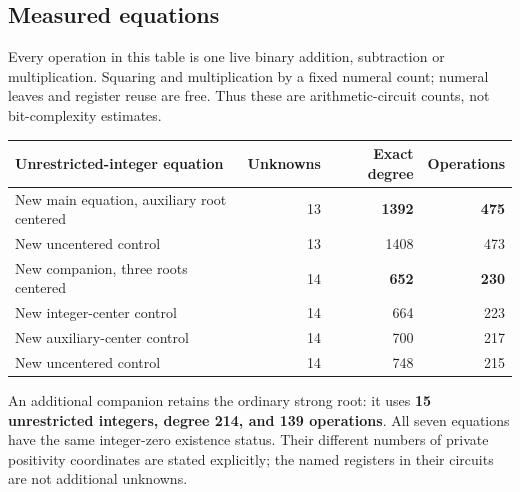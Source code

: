 \documentclass[11pt]{article}
\theoremstyle{remark}\newtheorem{remark}[theorem]{Remark}
\begin{document}
\subsection{Measured equations}
Every operation in this table is one live binary addition, subtraction or
multiplication. Squaring and multiplication by a fixed numeral count;
numeral leaves and register reuse are free. Thus these are arithmetic-circuit
counts, not bit-complexity estimates.
\begin{center}\small
\begin{tabular}{@{}lrrr@{}}\toprule
Unrestricted-integer equation & Unknowns & Exact degree & Operations\\\midrule
New main equation, auxiliary root centered & 13 & \textbf{1392} & \textbf{475}\\
New uncentered control & 13 & 1408 & 473\\
New companion, three roots centered & 14 & \textbf{652} & \textbf{230}\\
New integer-center control & 14 & 664 & 223\\
New auxiliary-center control & 14 & 700 & 217\\
New uncentered control & 14 & 748 & 215\\\bottomrule
\end{tabular}
\end{center}
An additional companion retains the ordinary strong root: it uses
\textbf{15 unrestricted integers, degree 214, and 139 operations}.
All seven equations have the same integer-zero existence status. Their
different numbers of private positivity coordinates are stated explicitly;
the named registers in their circuits are not additional unknowns.
\end{document}
